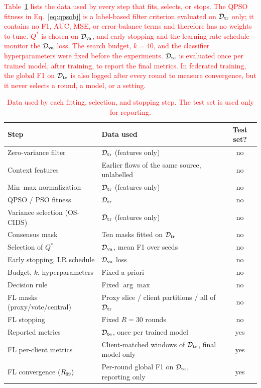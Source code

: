 \documentclass[conference]{IEEEtran}
\begin{document}
\textcolor{red}{Table~\ref{tab:data_usage} lists the data
used by every step that fits, selects, or stops. The
QPSO fitness in Eq.~\eqref{eq:qpsobj} is a label-based filter criterion
evaluated on $\mathcal{D}_{\rm tr}$ only; it contains no F1, AUC,
MSE, or error-balance terms and therefore has no weights to tune.
$Q^{*}$ is chosen on $\mathcal{D}_{\rm va}$, and early stopping and
the learning-rate schedule monitor the $\mathcal{D}_{\rm va}$ loss.
The search budget, $k=40$, and the classifier hyperparameters were
fixed before the experiments. $\mathcal{D}_{\rm te}$ is evaluated
once per trained model, after training, to report the final
metrics. In federated training, the global F1 on $\mathcal{D}_{\rm te}$
is also logged after every round to measure convergence, but it never
selects a round, a model, or a setting.}

\begin{table}[!t]
\centering
\scriptsize
\caption{\textcolor{red}{Data used by each fitting,
selection, and stopping step. The test set is used only for
reporting.}}
\label{tab:data_usage}
\color{red}
\setlength{\tabcolsep}{3pt}
\renewcommand{\arraystretch}{1.05}
\begin{tabular}{p{2.6cm} p{3.6cm} c}
\hline\toprule
\textbf{Step} & \textbf{Data used} & \textbf{Test set?} \\
\hline\toprule
Zero-variance filter & $\mathcal{D}_{\rm tr}$ (features only) & no \\
Context features & Earlier flows of the same source, unlabelled & no \\
Min--max normalization & $\mathcal{D}_{\rm tr}$ (features only) & no \\
QPSO / PSO fitness & $\mathcal{D}_{\rm tr}$ & no \\
Variance selection (OS-CIDS) & $\mathcal{D}_{\rm tr}$ (features only) & no \\
Consensus mask & Ten masks fitted on $\mathcal{D}_{\rm tr}$ & no \\
Selection of $Q^{*}$ & $\mathcal{D}_{\rm va}$, mean F1 over seeds & no \\
Early stopping, LR schedule & $\mathcal{D}_{\rm va}$ loss & no \\
Budget, $k$, hyperparameters & Fixed a priori & no \\
Decision rule & Fixed $\arg\max$ & no \\
FL masks (proxy/vote/central) & Proxy slice / client partitions / all of $\mathcal{D}_{\rm tr}$ & no \\
FL stopping & Fixed $R=30$ rounds & no \\
\midrule
Reported metrics & $\mathcal{D}_{\rm te}$, once per trained model & yes \\
FL per-client metrics & Client-matched windows of $\mathcal{D}_{\rm te}$, final model only & yes \\
FL convergence ($R_{99}$) & Per-round global F1 on $\mathcal{D}_{\rm te}$, reporting only & yes \\
\hline\toprule
\end{tabular}
\end{table}
\end{document}
